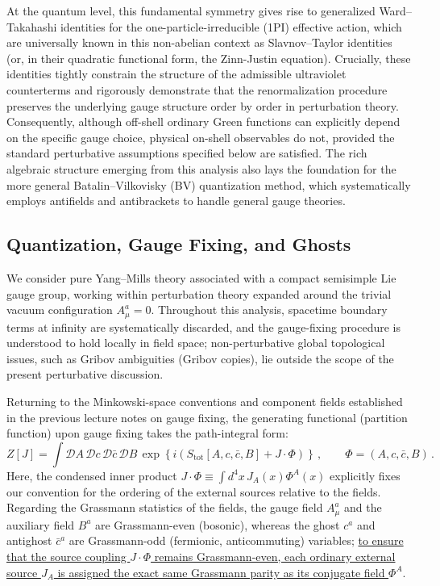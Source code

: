 At the quantum level, this fundamental symmetry gives rise to generalized Ward--Takahashi identities for the one-particle-irreducible (1PI) effective action, which are universally known in this non-abelian context as Slavnov--Taylor identities (or, in their quadratic functional form, the Zinn-Justin equation). Crucially, these identities tightly constrain the structure of the admissible ultraviolet counterterms and rigorously demonstrate that the renormalization procedure preserves the underlying gauge structure order by order in perturbation theory. Consequently, although off-shell ordinary Green functions can explicitly depend on the specific gauge choice, physical on-shell observables do not, provided the standard perturbative assumptions specified below are satisfied. The rich algebraic structure emerging from this analysis also lays the foundation for the more general Batalin--Vilkovisky (BV) quantization method, which systematically employs antifields and antibrackets to handle general gauge theories.

\subsection{Quantization, Gauge Fixing, and Ghosts}

We consider pure Yang--Mills theory associated with a compact semisimple Lie gauge group, working within perturbation theory expanded around the trivial vacuum configuration \(A_\mu^a = 0\). Throughout this analysis, spacetime boundary terms at infinity are systematically discarded, and the gauge-fixing procedure is understood to hold locally in field space; non-perturbative global topological issues, such as Gribov ambiguities (Gribov copies), lie outside the scope of the present perturbative discussion.

Returning to the Minkowski-space conventions and component fields established in the previous lecture notes on gauge fixing, the generating functional (partition function) upon gauge fixing takes the path-integral form:
\begin{equation} \label{eq:ym_partition_function}
    Z[J] = \int \mathcal{D}A \, \mathcal{D}c \, \mathcal{D}\bar{c} \, \mathcal{D}B \, \exp\left\{ i \left( S_{\text{tot}}[A, c, \bar{c}, B] + J \cdot \Phi \right) \right\} \, , \qquad \Phi = (A, c, \bar{c}, B) \, .
\end{equation}
Here, the condensed inner product \(J \cdot \Phi \equiv \int d^4x \, J_A(x) \Phi^A(x)\) explicitly fixes our convention for the ordering of the external sources relative to the fields. Regarding the Grassmann statistics of the fields, the gauge field \(A_\mu^a\) and the auxiliary field \(B^a\) are Grassmann-even (bosonic), whereas the ghost \(c^a\) and antighost \(\bar{c}^a\) are Grassmann-odd (fermionic, anticommuting) variables; \uline{to ensure that the source coupling \(J \cdot \Phi\) remains Grassmann-even, each ordinary external source \(J_A\) is assigned the exact same Grassmann parity as its conjugate field \(\Phi^A\)}.

